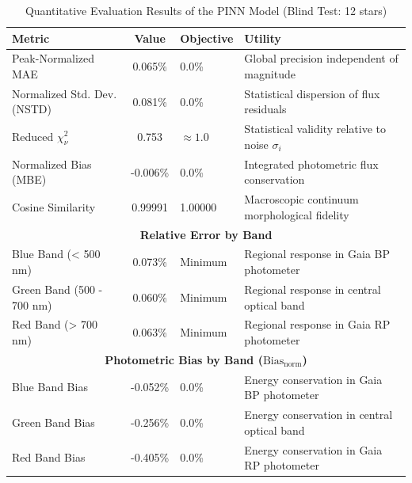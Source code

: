 
\begin{table}[htpb]
\centering
\caption{Quantitative Evaluation Results of the PINN Model (Blind Test: 12 stars)}
\label{tab:pinn_evaluation}
\begin{tabular}{lcll}
\hline
\textbf{Metric} & \textbf{Value} & \textbf{Objective} & \textbf{Utility} \\
\hline
Peak-Normalized MAE & 0.065\% & 0.0\% & Global precision independent of magnitude \\
Normalized Std. Dev. (NSTD) & 0.081\% & 0.0\% & Statistical dispersion of flux residuals \\
Reduced $\chi^2_\nu$ & 0.753 & $\approx 1.0$ & Statistical validity relative to noise $\sigma_i$ \\
Normalized Bias (MBE) & -0.006\% & 0.0\% & Integrated photometric flux conservation \\
Cosine Similarity & 0.99991 & 1.00000 & Macroscopic continuum morphological fidelity \\
\hline
\multicolumn{4}{c}{\textbf{Relative Error by Band}} \\
\hline
Blue Band (< 500 nm) & 0.073\% & Minimum & Regional response in Gaia BP photometer \\
Green Band (500 - 700 nm) & 0.060\% & Minimum & Regional response in central optical band \\
Red Band (> 700 nm) & 0.063\% & Minimum & Regional response in Gaia RP photometer \\
\hline
\multicolumn{4}{c}{\textbf{Photometric Bias by Band ($\text{Bias}_{\text{norm}}$)}} \\
\hline
Blue Band Bias & -0.052\% & 0.0\% & Energy conservation in Gaia BP photometer \\
Green Band Bias & -0.256\% & 0.0\% & Energy conservation in central optical band \\
Red Band Bias & -0.405\% & 0.0\% & Energy conservation in Gaia RP photometer \\
\hline
\end{tabular}
\end{table}
